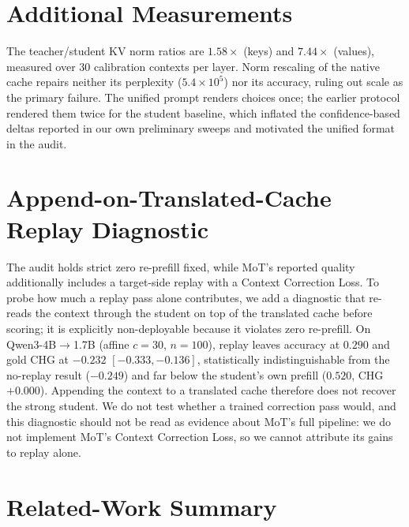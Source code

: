 \documentclass{article} %
\begin{document}
\section{Additional Measurements}
The teacher/student KV norm ratios are $1.58\times$ (keys) and $7.44\times$
(values), measured over 30 calibration contexts per layer. Norm rescaling of
the native cache repairs neither its perplexity ($5.4\times10^{5}$) nor its
accuracy, ruling out scale as the primary failure. The unified prompt
renders choices once; the earlier protocol rendered them twice for the
student baseline, which inflated the confidence-based deltas reported in our
own preliminary sweeps and motivated the unified format in the audit.


\section{Append-on-Translated-Cache Replay Diagnostic}
\label{app:replay}
The audit holds strict zero re-prefill fixed, while MoT's reported quality
additionally includes a target-side replay with a Context Correction Loss. To
probe how much a replay pass alone contributes, we add a diagnostic that
re-reads the context through the student on top of the translated cache before
scoring; it is explicitly non-deployable because it violates zero re-prefill.
On Qwen3-4B$\to$1.7B (affine $c{=}30$, $n{=}100$), replay leaves accuracy at
$0.290$ and gold CHG at $-0.232$ $[-0.333, -0.136]$, statistically
indistinguishable from the no-replay result ($-0.249$) and far below the
student's own prefill ($0.520$, CHG $+0.000$). Appending the context to a
translated cache therefore does not recover the strong student. We do not test
whether a trained correction pass would, and this diagnostic should not be read
as evidence about MoT's full pipeline: we do not implement MoT's Context
Correction Loss, so we cannot attribute its gains to replay alone.

\section{Related-Work Summary}
\label{app:related}
\end{document}
